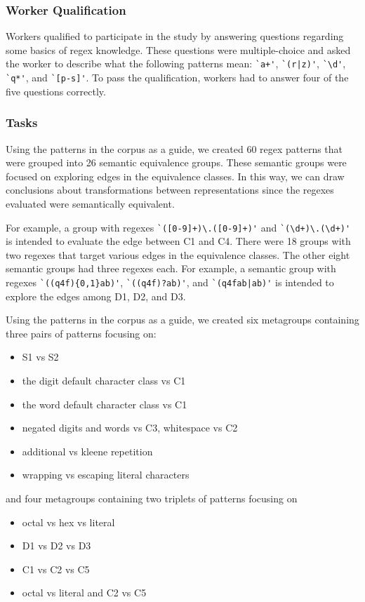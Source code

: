 \subsubsection{Worker Qualification}
Workers qualified to participate in the study by answering questions regarding some basics of regex knowledge. These questions were multiple-choice and asked the worker to describe what the following patterns mean: \verb!`a+'!, \verb!`(r|z)'!, \verb!`\d'!, \verb!`q*'!, and \verb!`[p-s]'!. To pass the qualification, workers had to answer four of the five questions correctly.

\subsubsection{Tasks}
Using the patterns in the corpus as a guide, we created 60 regex patterns that were grouped into 26 semantic equivalence groups.
These semantic groups were focused on exploring edges in the equivalence classes. In this way, we can draw conclusions about transformations between representations since the regexes evaluated were semantically equivalent.

For example, a  group with regexes \verb!`([0-9]+)\.([0-9]+)'! and  \verb!`(\d+)\.(\d+)'! is intended to evaluate the edge between C1 and C4.
There were 18 groups with two regexes that target various edges in the equivalence classes.
The other eight semantic groups had three regexes each.
For example, a semantic group with regexes \verb!`((q4f){0,1}ab)'!, \verb!`((q4f)?ab)'!, and \verb!`(q4fab|ab)'! is intended to explore the edges among D1, D2, and D3.

Using the patterns in the corpus as a guide, we created six metagroups containing three pairs of patterns focusing on:
\begin{itemize}
\item S1 vs S2
\item the digit default character class vs C1
\item the word default character class vs C1
\item negated digits and words vs C3, whitespace vs C2
\item additional vs kleene repetition
\item wrapping vs escaping literal characters
\end{itemize}
and four metagroups containing two triplets of patterns focusing on
\begin{itemize}
\item octal vs hex vs literal
\item D1 vs D2 vs D3
\item C1 vs C2 vs C5
\item octal vs literal and C2 vs C5
\end{itemize}

